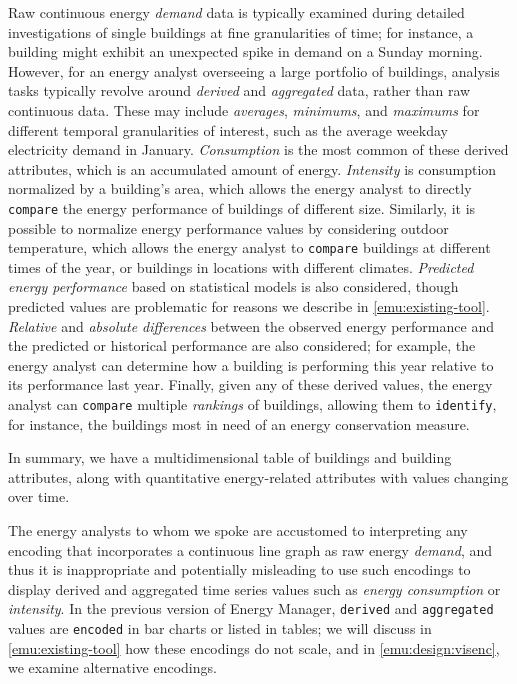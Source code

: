  Raw continuous energy {\it demand} data is typically examined during detailed investigations of single buildings at fine granularities of time; for instance, a building might exhibit an unexpected spike in demand on a Sunday morning. 
However, for an energy analyst overseeing a large portfolio of buildings, analysis tasks typically revolve around {\it derived} and {\it aggregated} data, rather than raw continuous data. 
These may include {\it averages}, {\it minimums}, and {\it maximums} for different temporal granularities of interest, such as the average weekday electricity demand in January.
{\it Consumption} is the most common of these derived attributes, which is an accumulated amount of energy.
{\it Intensity} is consumption normalized by a building's area, which allows the energy analyst to directly {\tt compare} the energy performance of buildings of different size.
Similarly, it is possible to normalize energy performance values by considering outdoor temperature, which allows the energy analyst to {\tt compare} buildings at different times of the year, or buildings in locations with different climates.
{\it Predicted energy performance} based on statistical models is also considered, though predicted values are problematic for reasons we describe in \autoref{emu:existing-tool}.
{\it Relative} and {\it absolute differences} between the observed energy performance and the predicted or historical performance are also considered; for example, the energy analyst can determine how a building is performing this year relative to its performance last year.
Finally, given any of these derived values, the energy analyst can {\tt compare} multiple {\it rankings} of buildings, allowing them to {\tt identify}, for instance, the buildings most in need of an energy conservation measure.

In summary, we have a multidimensional table of buildings and building attributes, along with quantitative energy-related attributes with values changing over time.

 The energy analysts to whom we spoke are accustomed to interpreting any encoding that incorporates a continuous line graph as raw energy {\it demand}, and thus it is inappropriate and potentially misleading to use such encodings to display derived and aggregated time series values such as {\it energy consumption} or {\it intensity}.
In the previous version of Energy Manager, {\tt derived} and {\tt aggregated} values are {\tt encoded} in bar charts or listed in tables; we will discuss in \autoref{emu:existing-tool} how these encodings do not scale, and in \autoref{emu:design:visenc}, we examine alternative encodings.

